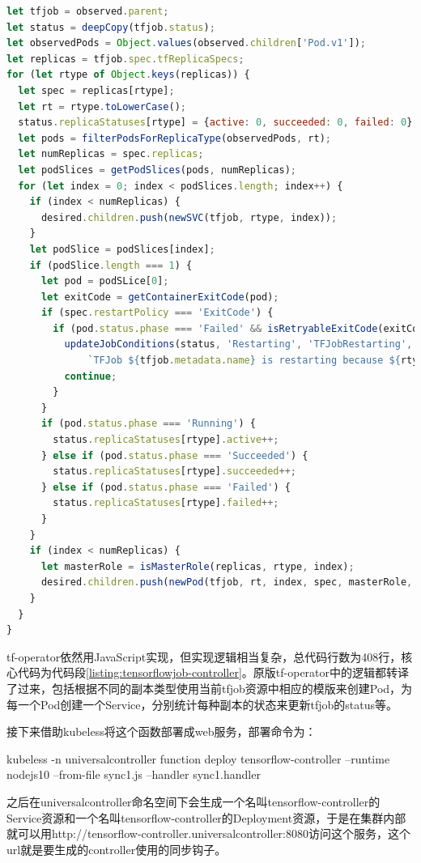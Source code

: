 \documentclass[macfonts,master]{njuthesis}
\begin{document}
\begin{lstlisting}[language=JavaScript,caption=tensorflowjob-controller的实现代码,label=listing:tensorflowjob-controller]
let tfjob = observed.parent;
let status = deepCopy(tfjob.status);
let observedPods = Object.values(observed.children['Pod.v1']);
let replicas = tfjob.spec.tfReplicaSpecs;
for (let rtype of Object.keys(replicas)) {
  let spec = replicas[rtype];
  let rt = rtype.toLowerCase();
  status.replicaStatuses[rtype] = {active: 0, succeeded: 0, failed: 0};
  let pods = filterPodsForReplicaType(observedPods, rt);
  let numReplicas = spec.replicas;
  let podSlices = getPodSlices(pods, numReplicas);
  for (let index = 0; index < podSlices.length; index++) {
    if (index < numReplicas) {
      desired.children.push(newSVC(tfjob, rtype, index));
    }
    let podSlice = podSlices[index];
    if (podSlice.length === 1) {
      let pod = podSLice[0];
      let exitCode = getContainerExitCode(pod);
      if (spec.restartPolicy === 'ExitCode') {
        if (pod.status.phase === 'Failed' && isRetryableExitCode(exitCode)) {
          updateJobConditions(status, 'Restarting', 'TFJobRestarting',
              `TFJob ${tfjob.metadata.name} is restarting because ${rtype} replica(s) failed.`);
          continue;
        }
      }
      if (pod.status.phase === 'Running') {
        status.replicaStatuses[rtype].active++;
      } else if (pod.status.phase === 'Succeeded') {
        status.replicaStatuses[rtype].succeeded++;
      } else if (pod.status.phase === 'Failed') {
        status.replicaStatuses[rtype].failed++;
      }
    }
    if (index < numReplicas) {
      let masterRole = isMasterRole(replicas, rtype, index);
      desired.children.push(newPod(tfjob, rt, index, spec, masterRole, replicas));
    }
  }
}
\end{lstlisting}

tf-operator依然用JavaScript实现，但实现逻辑相当复杂，总代码行数为408行，核心代码为代码段\ref{listing:tensorflowjob-controller}。原版tf-operator中的逻辑都转译了过来，包括根据不同的副本类型使用当前tfjob资源中相应的模版来创建Pod，为每一个Pod创建一个Service，分别统计每种副本的状态来更新tfjob的status等。

接下来借助kubeless将这个函数部署成web服务，部署命令为：

kubeless -n universalcontroller function deploy tensorflow-controller --runtime nodejs10 --from-file sync1.js --handler sync1.handler

之后在universalcontroller命名空间下会生成一个名叫tensorflow-controller的Service资源和一个名叫tensorflow-controller的Deployment资源，于是在集群内部就可以用http://tensorflow-controller.universalcontroller:8080访问这个服务，这个url就是要生成的controller使用的同步钩子。
\end{document}
